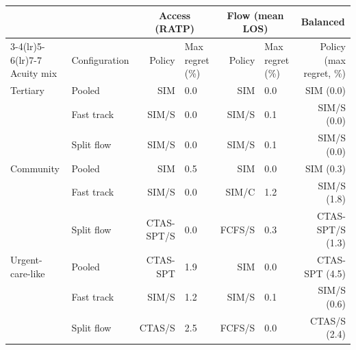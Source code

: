 \begin{tabular}{llrlrlr}
\toprule
 & & \multicolumn{2}{c}{Access (RATP)} & \multicolumn{2}{c}{Flow (mean LOS)} & \multicolumn{1}{c}{Balanced} \\
\cmidrule(lr){3-4}\cmidrule(lr){5-6}\cmidrule(lr){7-7}
Acuity mix & Configuration & Policy & Max regret (\%) & Policy & Max regret (\%) & Policy (max regret, \%) \\
\midrule
Tertiary & Pooled & SIM & 0.0 & SIM & 0.0 & SIM (0.0) \\
 & Fast track & SIM/S & 0.0 & SIM/S & 0.1 & SIM/S (0.0) \\
 & Split flow & SIM/S & 0.0 & SIM/S & 0.1 & SIM/S (0.0) \\
Community & Pooled & SIM & 0.5 & SIM & 0.0 & SIM (0.3) \\
 & Fast track & SIM/S & 0.0 & SIM/C & 1.2 & SIM/S (1.8) \\
 & Split flow & CTAS-SPT/S & 0.0 & FCFS/S & 0.3 & CTAS-SPT/S (1.3) \\
Urgent-care-like & Pooled & CTAS-SPT & 1.9 & SIM & 0.0 & CTAS-SPT (4.5) \\
 & Fast track & SIM/S & 1.2 & SIM/S & 0.1 & SIM/S (0.6) \\
 & Split flow & CTAS/S & 2.5 & FCFS/S & 0.0 & CTAS/S (2.4) \\
\bottomrule
\end{tabular}